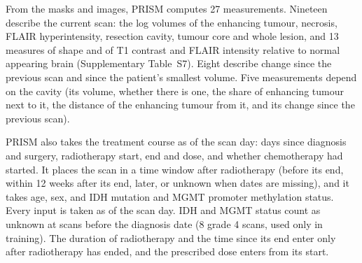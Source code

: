 From the masks and images, PRISM computes 27 measurements. Nineteen describe the current scan: the log volumes of the
enhancing tumour, necrosis, FLAIR hyperintensity, resection cavity, tumour core and whole lesion, and 13 measures of
shape and of T1 contrast and FLAIR intensity relative to normal appearing brain (Supplementary Table~S7). Eight
describe change since the previous scan and since the patient's smallest volume. Five measurements depend on the
cavity (its volume, whether there is one, the share of enhancing tumour next to it, the distance of the enhancing
tumour from it, and its change since the previous scan).

PRISM also takes the treatment course as of the scan day: days since diagnosis and surgery, radiotherapy start, end
and dose, and whether chemotherapy had started. It places the scan in a time window after radiotherapy (before its
end, within 12 weeks after its end, later, or unknown when dates are missing), and it takes age, sex, and IDH mutation
and MGMT promoter methylation status. Every input is taken as of the scan day. IDH and MGMT status count as unknown at
scans before the diagnosis date (8 grade 4 scans, used only in training). The duration of radiotherapy and the time
since its end enter only after radiotherapy has ended, and the prescribed dose enters from its start.

